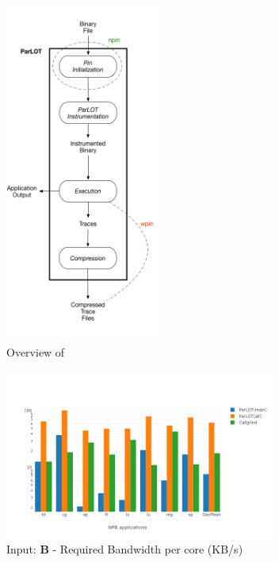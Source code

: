 \begin{figure}[!t]
\centering
\includegraphics[width=2in]{overview-all.png}
\caption{ Overview of \parlot}
\label{overviewAll}
\end{figure}







\begin{figure}[!t]
\centering
\includegraphics[width=3.5in]{figs.comet/comet_chartAvg_bw_B_p3_5.png}
\caption{ Input: \textbf{B} - Required Bandwidth per core (KB/s)
}
\label{comet_chartAvg_bw_B_p3_5}
\end{figure}

